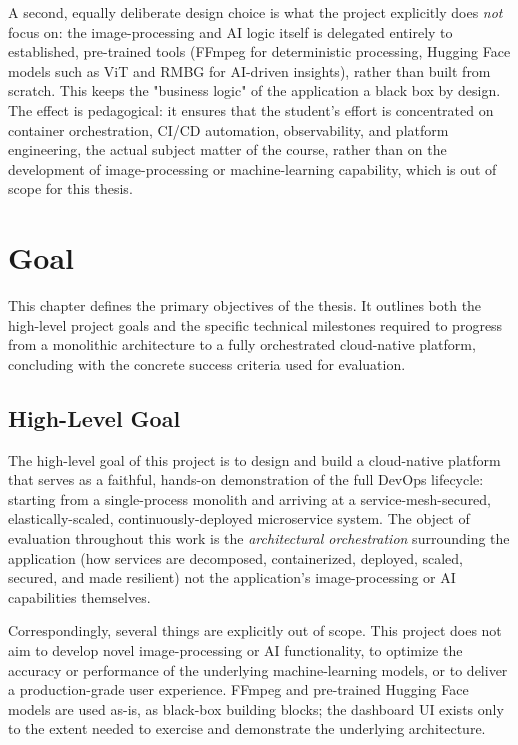 \documentclass[twoside]{supsistudent}
\begin{document}
A second, equally deliberate design choice is what the project explicitly does \emph{not} focus on: the image-processing and AI logic itself is delegated entirely to established, pre-trained tools (FFmpeg for deterministic processing, Hugging Face models such as ViT and RMBG for AI-driven insights), rather than built from scratch. This keeps the "business logic" of the application a black box by design. The effect is pedagogical: it ensures that the student's effort is concentrated on container orchestration, CI/CD automation, observability, and platform engineering, the actual subject matter of the course, rather than on the development of image-processing or machine-learning capability, which is out of scope for this thesis.

\chapter{Goal}
This chapter defines the primary objectives of the thesis. It outlines both the high-level project goals and the specific technical milestones required to progress from a monolithic architecture to a fully orchestrated cloud-native platform, concluding with the concrete success criteria used for evaluation.

\section{High-Level Goal}
The high-level goal of this project is to design and build a cloud-native platform that serves as a faithful, hands-on demonstration of the full DevOps lifecycle: starting from a single-process monolith and arriving at a service-mesh-secured, elastically-scaled, continuously-deployed microservice system. The object of evaluation throughout this work is the \emph{architectural orchestration} surrounding the application (how services are decomposed, containerized, deployed, scaled, secured, and made resilient) not the application's image-processing or AI capabilities themselves.

Correspondingly, several things are explicitly out of scope. This project does not aim to develop novel image-processing or AI functionality, to optimize the accuracy or performance of the underlying machine-learning models, or to deliver a production-grade user experience. FFmpeg and pre-trained Hugging Face models are used as-is, as black-box building blocks; the dashboard UI exists only to the extent needed to exercise and demonstrate the underlying architecture. %
\end{document}
